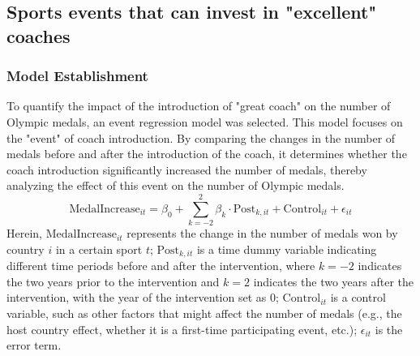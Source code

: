 \documentclass{mcmthesis}  %
\begin{document}
\subsection{Sports events that can invest in "excellent" coaches}
\subsubsection{Model Establishment}  %
\hspace*{1.5em}To quantify the impact of the introduction of "great coach" on the number of Olympic medals, an event regression model was selected. This model focuses on the "event" of coach introduction. By comparing the changes in the number of medals before and after the introduction of the coach, it determines whether the coach introduction significantly increased the number of medals, thereby analyzing the effect of this event on the number of Olympic medals. \[\text{MedalIncrease}_{it} = \beta_0 + \sum_{k = -2}^{2} \beta_k \cdot \text{Post}_{k,it} + \text{Control}_{it} + \epsilon_{it}\]
Herein, $\text{MedalIncrease}_{it}$ represents the change in the number of medals won by country $i$ in a certain sport $t$; $\text{Post}_{k,it}$ is a time dummy variable indicating different time periods before and after the intervention, where $k = -2$ indicates the two years prior to the intervention and $k = 2$ indicates the two years after the intervention, with the year of the intervention set as 0; $\text{Control}_{it}$ is a control variable, such as other factors that might affect the number of medals (e.g., the host country effect, whether it is a first-time participating event, etc.); $\epsilon_{it}$ is the error term.
\end{document}

